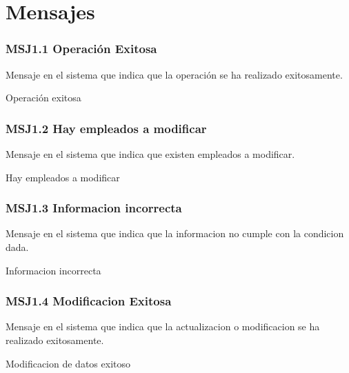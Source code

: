 \chapter{Mensajes}
\label{appendix:Mensajes}



\subsection{MSJ1.1 Operación Exitosa }

Mensaje en el sistema que indica que la operación se ha realizado exitosamente.

  \noindent Operación exitosa

\subsection{MSJ1.2 Hay empleados a modificar }

Mensaje en el sistema que indica que existen empleados a modificar.

  \noindent Hay empleados a modificar
  \subsection{MSJ1.3 Informacion incorrecta }

Mensaje en el sistema que indica que la informacion no cumple con la condicion dada.

  \noindent Informacion incorrecta
  \subsection{MSJ1.4 Modificacion Exitosa }

Mensaje en el sistema que indica que la actualizacion o modificacion se ha realizado exitosamente.

  \noindent Modificacion de datos exitoso







